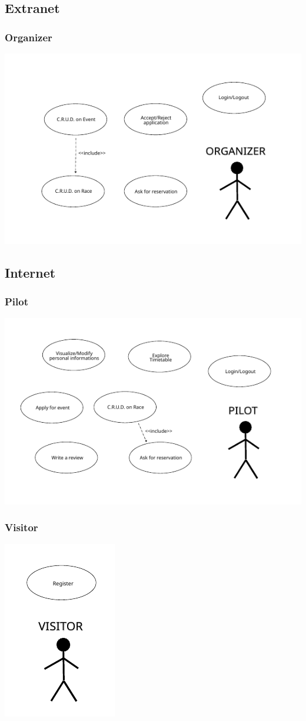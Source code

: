 \documentclass{beamer}
\begin{document}
\subsection*{Extranet}

\begin{frame}
    \frametitle{Organizer}
    \centering
    \includegraphics[width=0.9\linewidth]{drawings/uc-organizer.pdf}
\end{frame}

\subsection*{Internet}

\begin{frame}
    \frametitle{Pilot}
    \centering
    \includegraphics[width=0.9\linewidth]{drawings/uc-pilot.pdf}
\end{frame}

\begin{frame}
    \frametitle{Visitor}
    \centering
    \includegraphics[width=0.3\linewidth]{drawings/uc-visitor.pdf}
\end{frame}
\end{document}
